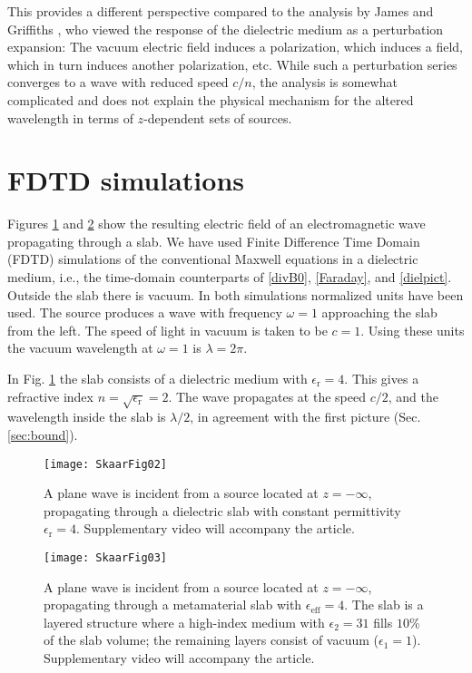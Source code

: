\documentclass[prb,twocolumn]{revtex4-1}
\begin{document}
This provides a different perspective compared to the analysis by James and Griffiths \cite{griffiths}, who viewed the response of the dielectric medium as a perturbation expansion: The vacuum electric field induces a polarization, which induces a field, which in turn induces another polarization, etc. While such a perturbation series converges to a wave with reduced speed $c/n$, the analysis is somewhat complicated and does not explain the physical mechanism for the altered wavelength in terms of $z$-dependent sets of sources.

\section{FDTD simulations}\label{sec:fdtd}
Figures \ref{fig:fdtd_a} and \ref{fig:fdtd_c} show the resulting electric field of an electromagnetic wave propagating through a slab. We have used Finite Difference Time Domain (FDTD) simulations \cite{yee66,kunz93,schneider10} of the conventional Maxwell equations in a dielectric medium, i.e., the time-domain counterparts of \eqref{divB0}, \eqref{Faraday}, and \eqref{dielpict}. Outside the slab there is vacuum. In both simulations normalized units have been used. The source produces a wave with frequency $\omega = 1$ approaching the slab from the left. The speed of light in vacuum is taken to be $c=1$. Using these units the vacuum wavelength at $\omega=1$ is $\lambda=2\pi$.

In Fig. \ref{fig:fdtd_a} the slab consists of a dielectric medium with $\epsilon_\text{r} = 4$. This gives a refractive index $n=\sqrt{\epsilon_\text{r}} = 2$. The wave propagates at the speed ${c}/{2}$, and the wavelength inside the slab is $\lambda/2$, in agreement with the first picture (Sec. \ref{sec:bound}). 

\begin{figure}[t!]
	\centering
    \texttt{[image: SkaarFig02]}
    \caption{A plane wave is incident from a source located at $z=-\infty$, propagating through a dielectric slab with constant permittivity $\epsilon_\text{r}=4$. Supplementary video will accompany the article.}
    \label{fig:fdtd_a}
\end{figure}
\begin{figure}[t!]
	\centering
    \texttt{[image: SkaarFig03]}
    \caption{A plane wave is incident from a source located at $z=-\infty$, propagating through a metamaterial slab with $\epsilon_\text{eff}=4$. The slab is a layered structure where a high-index medium with $\epsilon_2 = 31$ fills $10$\% of the slab volume; the remaining layers consist of vacuum ($\epsilon_1 = 1$). Supplementary video will accompany the article.}
    \label{fig:fdtd_c}
\end{figure}
\end{document}
